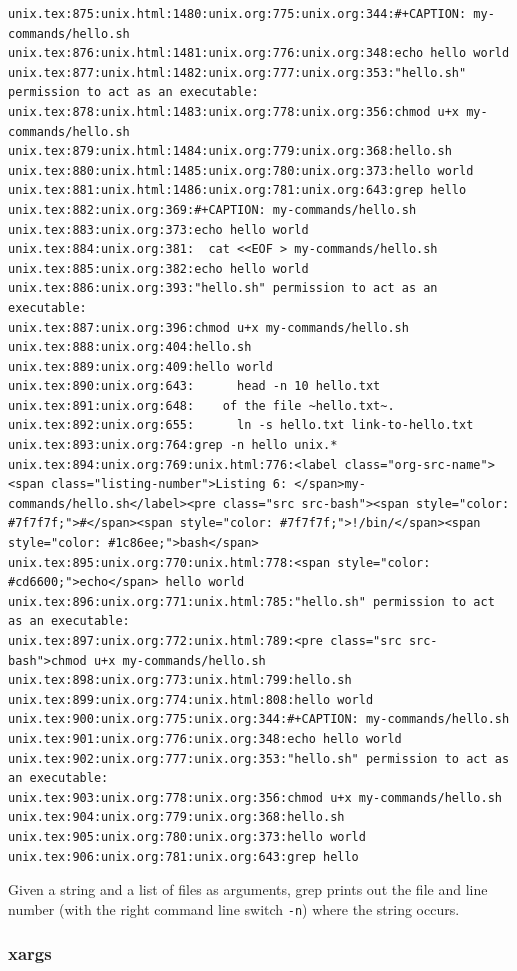 \documentclass[11pt]{article}
\begin{document}
\begin{verbatim}
unix.tex:875:unix.html:1480:unix.org:775:unix.org:344:#+CAPTION: my-commands/hello.sh
unix.tex:876:unix.html:1481:unix.org:776:unix.org:348:echo hello world
unix.tex:877:unix.html:1482:unix.org:777:unix.org:353:"hello.sh" permission to act as an executable:
unix.tex:878:unix.html:1483:unix.org:778:unix.org:356:chmod u+x my-commands/hello.sh
unix.tex:879:unix.html:1484:unix.org:779:unix.org:368:hello.sh
unix.tex:880:unix.html:1485:unix.org:780:unix.org:373:hello world
unix.tex:881:unix.html:1486:unix.org:781:unix.org:643:grep hello 
unix.tex:882:unix.org:369:#+CAPTION: my-commands/hello.sh
unix.tex:883:unix.org:373:echo hello world
unix.tex:884:unix.org:381:  cat <<EOF > my-commands/hello.sh
unix.tex:885:unix.org:382:echo hello world
unix.tex:886:unix.org:393:"hello.sh" permission to act as an executable:
unix.tex:887:unix.org:396:chmod u+x my-commands/hello.sh
unix.tex:888:unix.org:404:hello.sh
unix.tex:889:unix.org:409:hello world
unix.tex:890:unix.org:643:      head -n 10 hello.txt
unix.tex:891:unix.org:648:    of the file ~hello.txt~.
unix.tex:892:unix.org:655:      ln -s hello.txt link-to-hello.txt
unix.tex:893:unix.org:764:grep -n hello unix.*
unix.tex:894:unix.org:769:unix.html:776:<label class="org-src-name"><span class="listing-number">Listing 6: </span>my-commands/hello.sh</label><pre class="src src-bash"><span style="color: #7f7f7f;">#</span><span style="color: #7f7f7f;">!/bin/</span><span style="color: #1c86ee;">bash</span>
unix.tex:895:unix.org:770:unix.html:778:<span style="color: #cd6600;">echo</span> hello world
unix.tex:896:unix.org:771:unix.html:785:"hello.sh" permission to act as an executable:
unix.tex:897:unix.org:772:unix.html:789:<pre class="src src-bash">chmod u+x my-commands/hello.sh
unix.tex:898:unix.org:773:unix.html:799:hello.sh
unix.tex:899:unix.org:774:unix.html:808:hello world
unix.tex:900:unix.org:775:unix.org:344:#+CAPTION: my-commands/hello.sh
unix.tex:901:unix.org:776:unix.org:348:echo hello world
unix.tex:902:unix.org:777:unix.org:353:"hello.sh" permission to act as an executable:
unix.tex:903:unix.org:778:unix.org:356:chmod u+x my-commands/hello.sh
unix.tex:904:unix.org:779:unix.org:368:hello.sh
unix.tex:905:unix.org:780:unix.org:373:hello world
unix.tex:906:unix.org:781:unix.org:643:grep hello 
\end{verbatim}

Given a string and a list of files as arguments, grep prints out the
file and line number (with the right command line switch \texttt{-n}) where
the string occurs.

\subsubsection{xargs}
\label{sec:org7198bb0}
\end{document}
